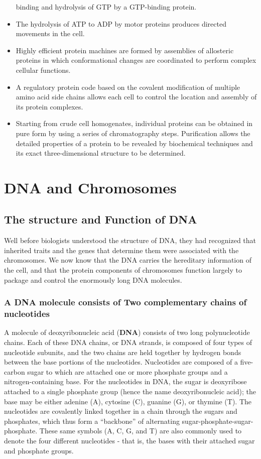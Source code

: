 \begin{itemize}
binding and hydrolysis of GTP by a GTP-binding protein.
\item The hydrolysis of ATP to ADP by motor proteins produces directed
movements in the cell.
\item Highly efficient protein machines are formed by assemblies of allosteric
proteins in which conformational changes are coordinated to
perform complex cellular functions.
\item A regulatory protein code based on the covalent modification of multiple
amino acid side chains allows each cell to control the location
and assembly of its protein complexes.
\item Starting from crude cell homogenates, individual proteins can be
obtained in pure form by using a series of chromatography steps.
Purification allows the detailed properties of a protein to be revealed
by biochemical techniques and its exact three-dimensional structure
to be determined.
\end{itemize}

\chapter{DNA and Chromosomes}

\section{The structure and Function of DNA}

Well before biologists understood the structure of DNA, they had recognized
that inherited traits and the genes that determine them were
associated with the chromosomes.
We now know that the DNA carries the hereditary information of the
cell, and that the protein components of chromosomes function largely
to package and control the enormously long DNA molecules.

\subsection{A DNA molecule consists of Two complementary chains of nucleotides}

A molecule of deoxyribonucleic acid (\textbf{DNA}) consists of two long polynucleotide
chains. Each of these DNA chains, or DNA strands, is composed
of four types of nucleotide subunits, and the two chains are held together
by hydrogen bonds between the base portions of the nucleotides.
Nucleotides are composed of a five-carbon sugar to which are attached one or more phosphate
groups and a nitrogen-containing base. For the nucleotides in DNA, the
sugar is deoxyribose attached to a single phosphate group (hence the
name deoxyribonucleic acid); the base may be either adenine (A), cytosine (C),
guanine (G), or thymine (T). The nucleotides are covalently linked
together in a chain through the sugars and phosphates, which thus form
a “backbone” of alternating sugar-phosphate-sugar-phosphate.
These same symbols (A, C, G, and T) are also commonly
used to denote the four different nucleotides - that is, the bases with their
attached sugar and phosphate groups.


